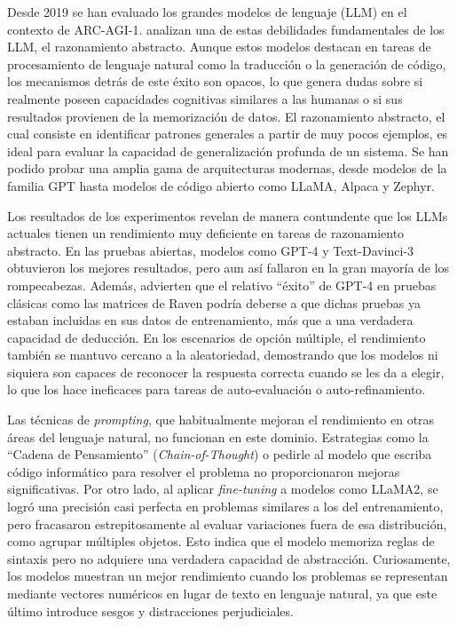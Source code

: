 \documentclass[11pt,a4paper,spanish]{book}
\numberwithin{equation}{chapter}
\numberwithin{figure}{chapter}
\begin{document}
Desde 2019 se han evaluado los grandes modelos de lenguaje (LLM) en el contexto de ARC-AGI-1.  analizan una de estas debilidades fundamentales de los LLM,
el razonamiento abstracto. Aunque estos modelos destacan en tareas de procesamiento de lenguaje natural como la traducción o 
la generación de código, los mecanismos detrás de este éxito son opacos, lo que genera dudas sobre si realmente poseen capacidades cognitivas similares a las humanas o si sus resultados
provienen de la memorización de datos. El razonamiento abstracto, el cual consiste en identificar patrones generales a partir de muy pocos
ejemplos, es ideal para evaluar la capacidad de generalización profunda de un sistema. Se han podido probar una amplia gama de arquitecturas modernas, desde modelos de la familia GPT hasta modelos de 
código abierto como LLaMA, Alpaca y Zephyr.

Los resultados de los experimentos revelan de manera contundente que los LLMs actuales tienen un rendimiento muy deficiente en tareas de razonamiento abstracto. En las 
pruebas abiertas, modelos como GPT-4 y Text-Davinci-3 obtuvieron los mejores resultados, pero aun así fallaron en la gran mayoría de los rompecabezas. Además,  
advierten que el relativo ``éxito'' de GPT-4 en pruebas clásicas como las matrices de Raven podría deberse a que dichas pruebas ya estaban incluidas en sus datos de 
entrenamiento, más que a una verdadera capacidad de deducción. En los escenarios de opción múltiple, el rendimiento también se mantuvo cercano a la aleatoriedad, 
demostrando que los modelos ni siquiera son capaces de reconocer la respuesta correcta cuando se les da a elegir, lo que los hace ineficaces para tareas de auto-evaluación o auto-refinamiento.

Las técnicas de \textit{prompting}, que habitualmente mejoran el rendimiento en otras áreas del lenguaje natural, no 
funcionan en este dominio. Estrategias como la ``Cadena de Pensamiento'' (\textit{Chain-of-Thought}) o pedirle al modelo que escriba código informático para resolver 
el problema no proporcionaron mejoras significativas. Por otro lado, al aplicar \textit{fine-tuning} a modelos como LLaMA2, se logró una precisión casi perfecta en 
problemas similares a los del entrenamiento, pero fracasaron estrepitosamente al evaluar variaciones fuera de esa distribución, como agrupar múltiples objetos. Esto 
indica que el modelo memoriza reglas de sintaxis pero no adquiere una verdadera capacidad de abstracción. Curiosamente, los modelos muestran un mejor 
rendimiento cuando los problemas se representan mediante vectores numéricos en lugar de texto en lenguaje natural, ya que este último introduce sesgos y 
distracciones perjudiciales.
\end{document}
